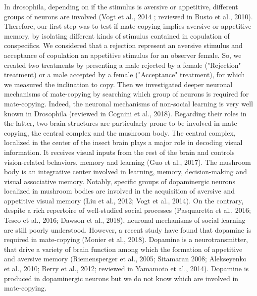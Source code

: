 \documentclass[a4paper, 12pt]{article}
\begin{document}
	In drosophila, depending on if the stimulus is aversive or appetitive, different groups of neurons are involved (Vogt et al., 2014 ; reviewed in Busto et al., 2010). Therefore, our first step was to test if mate-copying implies aversive or appetitive memory, by isolating different kinds of stimulus contained in copulation of conspecifics. We considered that a rejection represent an aversive stimulus and acceptance of copulation an appetitive stimulus for an observer female. So, we created two treatments by presenting a male rejected by a female ("Rejection" treatment) or a male accepted by a female ("Acceptance" treatment), for which we measured the inclination to copy. 
	Then we investigated deeper neuronal mechanisms of mate-copying by searching which group of neurons is required for mate-copying. Indeed, the neuronal mechanisms of non-social learning is very well known in Drosophila (reviewed in Cognini et al., 2018). Regarding their roles in the latter, two brain structures are particularly prone to be involved in mate-copying, the central complex and the mushroom body. The central complex, localized in the center of the insect brain plays a major role in decoding visual information. It receives visual inputs from the rest of the brain and controls vision-related behaviors, memory and learning (Guo et al., 2017). The mushroom body is an integrative center involved in learning, memory, decision-making  and visual associative memory. Notably, specific groups of dopaminergic neurons localized in mushroom bodies are involved in the acquisition of aversive and appetitive visual  memory (Liu et al., 2012; Vogt et al., 2014). 
	On the contrary, despite a rich repertoire of well-studied social processes (Pasquaretta et al., 2016; Teseo et al., 2016; Dawson et al., 2018), neuronal mechanisms of social learning are still poorly understood. However, a recent study have found that dopamine is required in mate-copying (Monier et al., 2018). Dopamine is a neurotransmitter, that drive a  variety of brain function among which the formation of appetitive and aversive memory (Riemensperger et al., 2005; Sitamaran 2008; Alekseyenko et al., 2010; Berry et al., 2012; reviewed in Yamamoto et al., 2014). Dopamine is produced in dopaminergic neurons but we do not know which are involved in mate-copying. 
\end{document}
